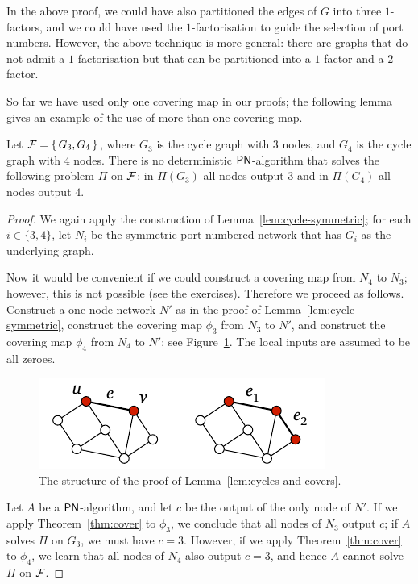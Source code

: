 In the above proof, we could have also partitioned the edges of $G$ into three $1$-factors, and we could have used the $1$-factorisation to guide the selection of port numbers. However, the above technique is more general: there are  graphs that do not admit a $1$-factorisation but that can be partitioned into a $1$-factor and a $2$-factor.

So far we have used only one covering map in our proofs; the following lemma gives an example of the use of more than one covering map.

\begin{lemma}\label{lem:cycles-and-covers}
    Let $\mathcal{F} = \{\, G_3, G_4 \,\}$, where $G_3$ is the cycle graph with $3$ nodes, and $G_4$ is the cycle graph with $4$ nodes. There is no deterministic $\textup{\sffamily PN}$-algorithm that solves the following problem $\Pi$ on $\mathcal{F}$: in $\Pi(G_3)$ all nodes output $3$ and in $\Pi(G_4)$ all nodes output $4$.
\end{lemma}
\begin{proof}
    We again apply the construction of Lemma~\ref{lem:cycle-symmetric}; for each $i \in \{3,4\}$, let $N_i$ be the symmetric port-numbered network that has $G_i$ as the underlying graph.
    
    Now it would be convenient if we could construct a covering map from $N_4$ to $N_3$; however, this is not possible (see the exercises). Therefore we proceed as follows. Construct a one-node network $N'$ as in the proof of Lemma~\ref{lem:cycle-symmetric}, construct the covering map $\phi_3$ from $N_3$ to $N'$, and construct the covering map $\phi_4$ from $N_4$ to $N'$; see Figure~\ref{fig:cycles-and-covers}. The local inputs are assumed to be all zeroes.

    \begin{figure}
        \centering
        \includegraphics[page=\PCyclesAndCovers]{figs.pdf}
        \caption{The structure of the proof of Lemma~\ref{lem:cycles-and-covers}.}\label{fig:cycles-and-covers}
    \end{figure}
    
    Let $A$ be a $\textup{\sffamily PN}$-algorithm, and let $c$ be the output of the only node of $N'$. If we apply Theorem~\ref{thm:cover} to $\phi_3$, we conclude that all nodes of $N_3$ output $c$; if $A$ solves $\Pi$ on $G_3$, we must have $c = 3$. However, if we apply Theorem~\ref{thm:cover} to $\phi_4$, we learn that all nodes of $N_4$ also output $c = 3$, and hence $A$ cannot solve $\Pi$ on $\mathcal{F}$.
\end{proof}

